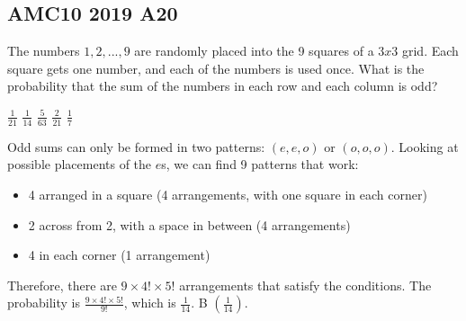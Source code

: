 \documentclass[12pt]{exam}
\begin{document}
\thispagestyle{empty}

\begin{center}\section*{AMC10 2019 A20}

\end{center}
\bigskip
\begin{questions}

\question 
The numbers $1, 2, ..., 9$ are randomly placed into the 9 squares of a $3 x 3$ grid. Each 
square gets one number, and each of the numbers is used once. What is the probability that
the sum of the numbers in each row and each column is odd?
\bigskip

\begin{oneparchoices}
    \choice $\frac{1}{21}$
    \choice $\frac{1}{14}$
    \choice $\frac{5}{63}$
    \choice $\frac{2}{21}$
    \choice $\frac{1}{7}$
\end{oneparchoices}

\vspace{0.5cm}
Odd sums can only be formed in two patterns: $(e, e, o)$ or $(o, o, o)$.
Looking at possible placements of the $e$s, we can find 9 patterns that work:
\begin{itemize}
    \item 4 arranged in a square (4 arrangements, with one square in each corner)
      \\[0.25cm]
      
    \item 2 across from 2, with a space in between (4 arrangements)
      \\[0.25cm]
    
    \item 4 in each corner (1 arrangement)
      \\[0.25cm]
  
\end{itemize}

\vspace{0.5cm}
Therefore, there are $9 \times 4! \times 5!$ arrangements that 
satisfy the conditions. The probability is $\frac{9 \times 4! \times 5!}{9!}$, 
which is $\frac{1}{14}$. B $\left (\frac{1}{14} \right)$.

\end{questions}
\end{document}
